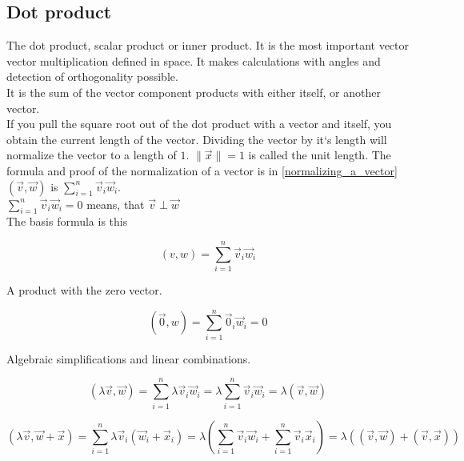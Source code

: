 \documentclass[a4paper]{article}
\begin{document}
\begin{Example}
\subsection{Dot product}

The dot product, scalar product or inner product.
It is the most important vector vector multiplication defined in space.
It makes calculations with angles and detection of orthogonality possible.\\

It is the sum of the vector component products with either itself, or another vector.\\

If you pull the square root out of the dot product with a vector and itself, you obtain the current length of the vector.
Dividing the vector by it`s length will normalize the vector to a length of $1$. $\|\vec{x}\| = 1$ is called the unit length.
The formula and proof of the normalization of a vector is in \ref{normalizing_a_vector}\\

$(\vec{v}, \vec{w})$ is $\sum_{i=1}^{n}\vec{v}_{i}\vec{w}_{i}$.  \\

$\sum_{i=1}^{n}\vec{v}_{i}\vec{w}_{i} = 0$ means, that $\vec{v} \perp \vec{w}$ \\

The basis formula is this

\begin{displaymath}
    (v,w) = \sum_{i=1}^{n}\vec{v}_{i}\vec{w}_{i}
\end{displaymath}

A product with the zero vector.

\begin{displaymath}
    (\vec{0},w) = \sum_{i=1}^{n}\vec{0}_{i}\vec{w}_{i} = 0
\end{displaymath}

Algebraic simplifications and linear combinations.

\begin{displaymath}
    (\lambda\vec{v},\vec{w}) = \sum_{i=1}^{n}\lambda\vec{v}_{i}\vec{w}_{i}
    = \lambda\sum_{i=1}^{n}\vec{v}_{i}\vec{w}_{i} = \lambda(\vec{v}, \vec{w})
\end{displaymath}

\begin{displaymath}
    (\lambda\vec{v},\vec{w}+\vec{x}) = \sum_{i=1}^{n}\lambda\vec{v}_{i}(\vec{w}_{i}+\vec{x}_{i})
    = \lambda(\sum_{i=1}^{n}\vec{v}_{i}\vec{w}_{i}+\sum_{i=1}^{n}\vec{v}_{i}\vec{x}_{i})
    = \lambda((\vec{v},\vec{w})+(\vec{v},\vec{x}))
\end{displaymath}


\end{Example}
\end{document}
